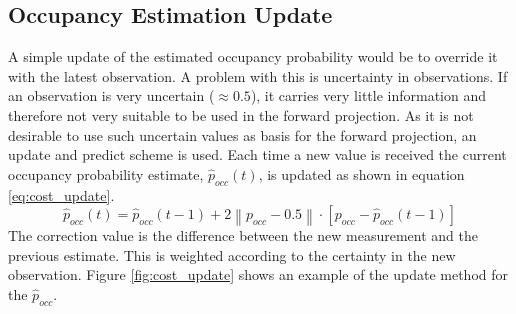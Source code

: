 \subsection{Occupancy Estimation Update}
A simple update of the estimated occupancy probability would be to override it with the latest observation.  
A problem with this is uncertainty in observations. 
If an observation is very uncertain ($\approx0.5$), it carries very little information and therefore not very suitable to be used in the forward projection. 
As it is not desirable to use such uncertain values as basis for the forward projection, an update and predict scheme is used.
Each time a new value is received the current occupancy probability estimate, \(\hat{p}_{occ}(t)\), is updated as shown in equation \ref{eq:cost_update}.
%
\begin{equation}
\label{eq:cost_update}
\hat{p}_{occ}(t) = \hat{p}_{occ}(t-1) +  2  \left\| p_{occ} - 0.5 \right\| \cdot \left[p_{occ} - \hat{p}_{occ}(t-1) \right]  
\end{equation}
%
The correction value is the difference between the new measurement and the previous estimate.
This is weighted according to the certainty in the new observation.  
Figure \ref{fig:cost_update} shows an example of the update method for the \(\hat{p}_{occ}\). 

